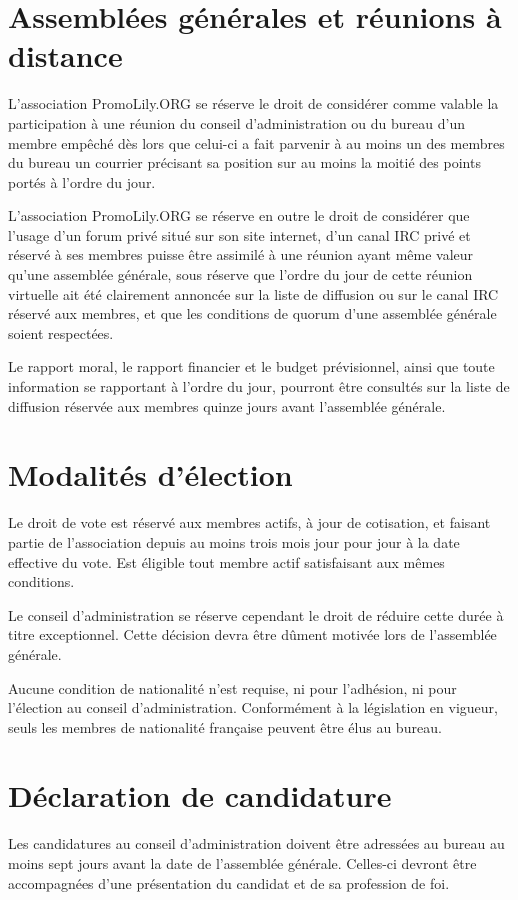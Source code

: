 \documentclass[a4wide,12pt]{scrartcl}
\newcommand{\qui}{PromoLily.ORG\xspace}
\begin{document}
\section{Assemblées générales et réunions à distance}
L'association \qui se réserve le droit de considérer comme valable la
participation à une réunion du conseil d'administration ou du bureau
d'un membre empêché dès lors que celui-ci a fait parvenir à au moins
un des membres du bureau un courrier précisant sa position sur au
moins la moitié des points portés à l'ordre du jour.

L'association \qui se réserve en outre le droit de considérer que
l'usage d'un forum privé situé sur son site internet, d'un canal IRC
privé et réservé à ses membres puisse être assimilé à une réunion
ayant même valeur qu'une assemblée générale, sous réserve que l'ordre
du jour de cette réunion virtuelle ait été clairement annoncée sur la
liste de diffusion ou sur le canal IRC réservé aux membres, et que les
conditions de quorum d'une assemblée générale soient respectées. 

Le rapport moral, le rapport financier et le budget prévisionnel,
ainsi que toute information se rapportant à l'ordre du jour, pourront
être consultés sur la liste de diffusion réservée aux membres quinze
jours avant l'assemblée générale.


\section{Modalités d'élection}
Le droit de vote est réservé aux membres actifs, à jour de cotisation,
et faisant partie de l'association depuis au moins trois mois jour
pour jour à la date effective du vote. Est éligible tout membre actif
satisfaisant aux mêmes conditions.

Le conseil d'administration se réserve cependant le droit de réduire
cette durée à titre exceptionnel. Cette décision devra être dûment
motivée lors de l'assemblée générale.

Aucune condition de nationalité n'est requise, ni pour l'adhésion, ni
pour l'élection au conseil d'administration. Conformément à la
législation en vigueur, seuls les membres de nationalité française
peuvent être élus au bureau.


\section{Déclaration de candidature}
Les candidatures au conseil d'administration doivent être adressées au
bureau au moins sept jours avant la date de l'assemblée générale.
Celles-ci devront être accompagnées d'une présentation du candidat et
de sa profession de foi. 
\end{document}

